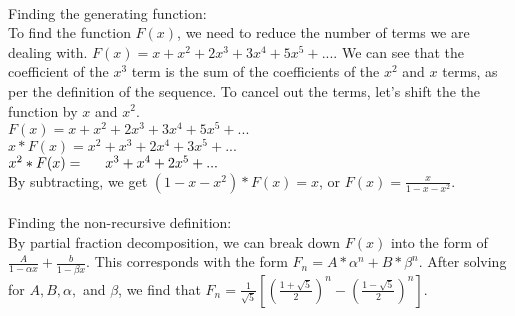 \begin{solution} \\
Finding the generating function: \\To find the function $F(x)$, we need to reduce the number of terms we are dealing with. $F(x) = x + x^2 + 2x^3 + 3x^4 + 5x^5 + ...$. We can see that the coefficient of the $x^3$ term is the sum of the coefficients of the $x^2$ and $x$ terms, as per the definition of the sequence. To cancel out the terms, let's shift the the function by ${x}$ and ${x^2}$.\\
$F(x) = x + x^2 + 2x^3 + 3x^4 + 5x^5 + ...$\\
$x * F(x) = x^2 + x^3 + 2x^4 + 3x^5 + ...$ \\
$x^2*F(x) = \indent   x^3 + x^4 + 2x^5 + ...$ \\
By subtracting, we get $(1-x-x^2)*F(x) = x$, or $F(x) = \frac{x}{1-x-x^2}$. \\ \\ 
Finding the non-recursive definition: \\By partial fraction decomposition, we can break down $F(x)$ into the form of $\frac{A}{1-\alpha x}+\frac{b}{1-\beta x}$. This corresponds with the form $F_{n}=A*\alpha ^n + B*\beta ^n$. After solving for $A, B, \alpha,$ and $\beta$, we find that $F_{n}=\frac{1}{\sqrt{5}}[(\frac{1+\sqrt{5}}{2})^{n} - (\frac{1-\sqrt{5}}{2})^{n}]$.
\end{solution}


% 
